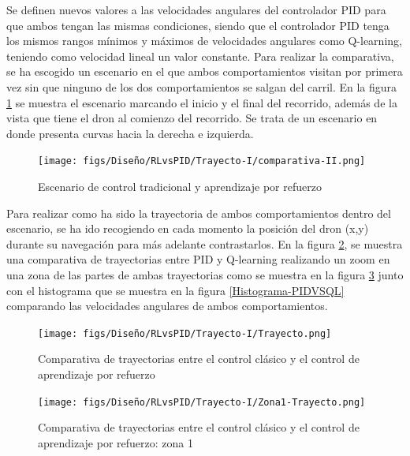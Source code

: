 Se definen nuevos valores a las velocidades angulares del controlador PID para que ambos tengan las mismas condiciones, siendo que el controlador PID tenga los mismos 
rangos mínimos y máximos de velocidades angulares como Q-learning, teniendo como velocidad lineal un valor constante. Para realizar la comparativa, se ha escogido un escenario en el que ambos comportamientos visitan por primera vez 
sin que ninguno de los dos comportamientos se salgan del carril. En la figura \ref{fig:escenario-comparativa} se muestra el escenario marcando el inicio 
y el final del recorrido, además de la vista que tiene el dron al comienzo del recorrido. Se trata de un escenario en donde presenta curvas hacia la derecha e izquierda.


\begin{figure} [H]
  \begin{center}
    \texttt{[image: figs/Diseño/RLvsPID/Trayecto-I/comparativa-II.png]}
  \end{center}
  \caption{Escenario de control tradicional y aprendizaje por refuerzo}
  \label{fig:escenario-comparativa}
\end{figure}

Para realizar como ha sido la trayectoria de ambos comportamientos dentro del escenario, se ha ido recogiendo en cada momento la posición del dron (x,y) durante su navegación
 para más adelante contrastarlos. En la figura \ref{fig:Comparativa-de-trayectorias}, se muestra una comparativa de trayectorias entre PID y Q-learning 
realizando un zoom en una zona de las partes de ambas 
trayectorias como se muestra en la figura \ref{fig:Comparativa-de-trayectorias-II} junto con el histograma que se muestra en la figura \ref{Histograma-PIDVSQL} comparando 
las velocidades angulares de ambos comportamientos.

\begin{figure}[H]
  \centering
  \begin{minipage}{0.65\textwidth}
    \texttt{[image: figs/Diseño/RLvsPID/Trayecto-I/Trayecto.png]}
  \end{minipage}
  \vspace{-1.0em}
  \caption{Comparativa de trayectorias entre el control clásico y el control de aprendizaje por refuerzo}
  \label{fig:Comparativa-de-trayectorias}
\end{figure}

\begin{figure}[H]
  \centering
  \begin{minipage}{0.65\textwidth}
    \texttt{[image: figs/Diseño/RLvsPID/Trayecto-I/Zona1-Trayecto.png]}
  \end{minipage}
  \vspace{-1.0em}
  \caption{Comparativa de trayectorias entre el control clásico y el control de aprendizaje por refuerzo: zona 1}
  \label{fig:Comparativa-de-trayectorias-II}
\end{figure}

